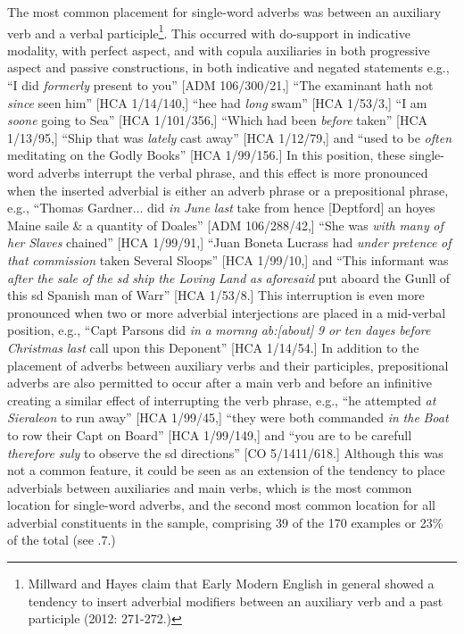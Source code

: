 The most common placement for single-word adverbs was between an auxiliary verb and a verbal participle\footnote{Millward and Hayes claim that Early Modern English in general showed a tendency to insert adverbial modifiers between an auxiliary verb and a past participle (2012: 271-272.)}. This occurred with do-support in indicative modality, with perfect aspect, and with copula auxiliaries in both progressive aspect and passive constructions, in both indicative and negated statements e.g., “I did \textit{formerly} present to you” [ADM 106/300/21,] “The examinant hath not \textit{since} seen him” [HCA 1/14/140,] “hee had \textit{long} swam” [HCA 1/53/3,] “I am \textit{soone} going to Sea” [HCA 1/101/356,] “Which had been \textit{before} taken” [HCA 1/13/95,] “Ship that was \textit{lately} cast away” [HCA 1/12/79,] and “used to be \textit{often} meditating on the Godly Books” [HCA 1/99/156.] In this position, these single-word adverbs interrupt the verbal phrase, and this effect is more pronounced when the inserted adverbial is either an adverb phrase or a prepositional phrase, e.g., “Thomas Gardner... did \textit{in} \textit{June} \textit{last} take from hence [Deptford] an hoyes Maine saile \& a quantity of Doales” [ADM 106/288/42,] “She was \textit{with} \textit{many} \textit{of} \textit{her} \textit{Slaves} chained” [HCA 1/99/91,]  “Juan Boneta Lucrass had \textit{under} \textit{pretence} \textit{of} \textit{that} \textit{commission} taken Several Sloops” [HCA 1/99/10,] and “This informant was \textit{after} \textit{the} \textit{sale} \textit{of} \textit{the} \textit{sd} \textit{ship} \textit{the} \textit{Loving} \textit{Land} \textit{as} \textit{aforesaid} put aboard the Gunll of this sd Spanish man of Warr” [HCA 1/53/8.] This interruption is even more pronounced when two or more adverbial interjections are placed in a mid-verbal position, e.g., “Capt Parsons did \textit{in} \textit{a} \textit{mornng} \textit{ab:[about]} \textit{9} \textit{or} \textit{ten} \textit{dayes} \textit{before} \textit{Christmas} \textit{last} call upon this Deponent” [HCA 1/14/54.] In addition to the placement of adverbs between auxiliary verbs and their participles, prepositional adverbs are also permitted to occur after a main verb and before an infinitive creating a similar effect of interrupting the verb phrase, e.g., “he attempted \textit{at} \textit{Sieraleon} to run away” [HCA 1/99/45,] “they were both commanded \textit{in} \textit{the} \textit{Boat} to row their Capt on Board”  [HCA 1/99/149,] and “you are to be carefull \textit{therefore} \textit{suly} to observe the sd directions” [CO 5/1411/618.] Although this was not a common feature, it could be seen as an extension of the tendency to place adverbials between auxiliaries and main verbs, which is the most common location for single-word adverbs, and the second most common location for all adverbial constituents in the sample, comprising 39 of the 170 examples or 23\% of the total (see .7.)

